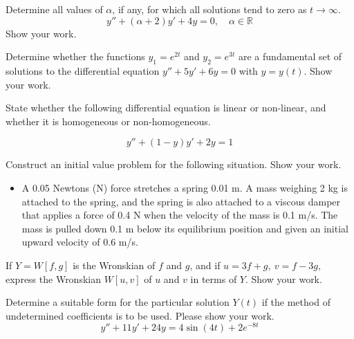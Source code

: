 \documentclass[12pt]{exam}
\begin{document}
    


\newpage


\InitialsRight

\begin{questions}




    \question[2] Determine all values of $\alpha$, if any, for which all solutions tend to zero as $t\to\infty$. $$y'' +(\alpha+2)y'+4y = 0 , \quad \alpha \in \mathbb R$$ Show your work. \vspace{6cm}  
    
    \question[2] Determine whether the functions $y_1 = e^{2t}$ and $y_2 = e^{3t} $ are a fundamental set of solutions to the differential equation $y''+5y'+6y = 0$ with $y=y(t)$. Show your work. 
    
    \newpage
    
    \question[1] State whether the following differential equation is linear or non-linear, and whether it is homogeneous or non-homogeneous. 
    
    $$y'' + (1-y)y' + 2y = 1$$
    
    \vspace{4cm}
    
    \question[3] Construct an initial value problem for the following situation. Show your work.  

    \begin{itemize}
        \item[] A 0.05 Newtons (N) force stretches a spring 0.01 m. A mass weighing 2 kg is attached to the spring, and the spring is also attached to a viscous damper that applies a force of 0.4 N when the velocity of the mass is 0.1 m/s. The mass is pulled down 0.1 m below its equilibrium position and given an initial upward velocity of 0.6 m/s. 
    \end{itemize}
    
    
    \newpage \Initials
    
    \question[3] If $Y = W[f, g]$ is the Wronskian of $f$ and $g$, and if $u=3f+g, \ v=f-3g$, express the Wronskian $W[u,v]$ of $u$ and $v$ in terms of $Y$. Show your work. 
    
    \vspace{8cm}
    
    \question[3] Determine a suitable form for the particular solution \(Y(t)\) if the method of undetermined coefficients is to be used. Please show your work. 
    $$y''+ 11y'+24y = 4\sin(4t)+2e^{-8t}$$    
    

\end{questions}
\end{document}

